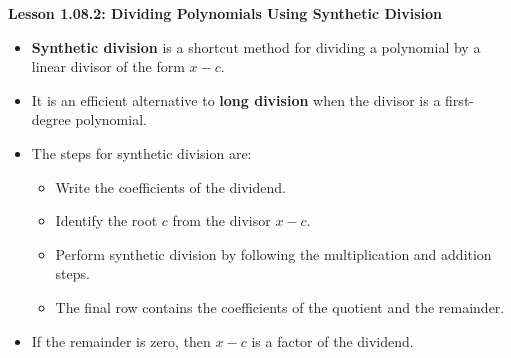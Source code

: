 \begin{center}
\textbf{Lesson 1.08.2: Dividing Polynomials Using Synthetic Division}
\end{center}

\vspace*{-1.5ex}

\begin{itemize}
    \item \textbf{Synthetic division} is a shortcut method for dividing a polynomial by a linear divisor of the form \(x - c\).
    \item It is an efficient alternative to \textbf{long division} when the divisor is a first-degree polynomial.
    \item The steps for synthetic division are:
          \begin{itemize}
              \item Write the coefficients of the dividend.
              \item Identify the root \(c\) from the divisor \(x - c\).
              \item Perform synthetic division by following the multiplication and addition steps.
              \item The final row contains the coefficients of the quotient and the remainder.
          \end{itemize}
    \item If the remainder is zero, then \(x - c\) is a factor of the dividend.
\end{itemize}